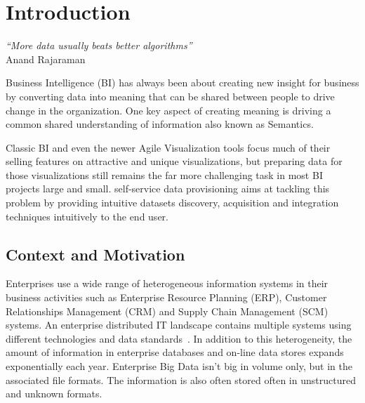 \chapter{Introduction}  \label{ch:intro}
\graphicspath{{introduction/figures/}}

\begin{flushright}
\textit{``More data usually beats better algorithms''}\\
 Anand Rajaraman

\end{flushright}

Business Intelligence (BI) has always been about creating new insight for business by converting data into meaning that can be shared between people to drive change in the organization. One key aspect of creating meaning is driving a common shared understanding of information also known as Semantics.

Classic BI and even the newer Agile Visualization tools focus much of their selling features on attractive and unique visualizations, but preparing data for those visualizations still remains the far more challenging task in most BI projects large and small. self-service data provisioning aims at tackling this problem by providing intuitive datasets discovery, acquisition and integration techniques intuitively to the end user.

\section{Context and Motivation} \label{sec:motivation}

Enterprises use a wide range of heterogeneous information systems in their business activities such as Enterprise Resource Planning (ERP), Customer Relationships Management (CRM) and Supply Chain Management (SCM) systems. An enterprise distributed IT landscape contains multiple systems using different technologies and data standards~\cite{Mihindukulasooriya:COLD:13}. In addition to this heterogeneity, the amount of information in enterprise databases and on-line data stores expands exponentially each year. Enterprise Big Data isn't big in volume only, but in the associated file formats. The information is also often stored often in unstructured and unknown formats.

